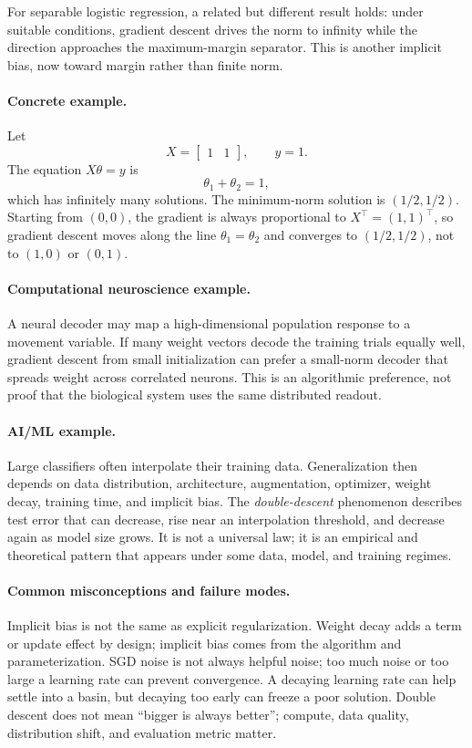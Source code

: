 For separable logistic regression, a related but different result holds: under suitable conditions, gradient descent drives the norm to infinity while the direction approaches the maximum-margin separator. This is another implicit bias, now toward margin rather than finite norm.

\paragraph{Concrete example.}
Let
\[
X=\begin{bmatrix}1&1\end{bmatrix},\qquad y=1.
\]
The equation \(X\theta=y\) is
\[
\theta_1+\theta_2=1,
\]
which has infinitely many solutions. The minimum-norm solution is \((1/2,1/2)\). Starting from \((0,0)\), the gradient is always proportional to \(X^\top=(1,1)^\top\), so gradient descent moves along the line \(\theta_1=\theta_2\) and converges to \((1/2,1/2)\), not to \((1,0)\) or \((0,1)\).

\paragraph{Computational neuroscience example.}
A neural decoder may map a high-dimensional population response to a movement variable. If many weight vectors decode the training trials equally well, gradient descent from small initialization can prefer a small-norm decoder that spreads weight across correlated neurons. This is an algorithmic preference, not proof that the biological system uses the same distributed readout.

\paragraph{AI/ML example.}
Large classifiers often interpolate their training data. Generalization then depends on data distribution, architecture, augmentation, optimizer, weight decay, training time, and implicit bias. The \emph{double-descent} phenomenon describes test error that can decrease, rise near an interpolation threshold, and decrease again as model size grows. It is not a universal law; it is an empirical and theoretical pattern that appears under some data, model, and training regimes.

\paragraph{Common misconceptions and failure modes.}
Implicit bias is not the same as explicit regularization. Weight decay adds a term or update effect by design; implicit bias comes from the algorithm and parameterization. SGD noise is not always helpful noise; too much noise or too large a learning rate can prevent convergence. A decaying learning rate can help settle into a basin, but decaying too early can freeze a poor solution. Double descent does not mean ``bigger is always better''; compute, data quality, distribution shift, and evaluation metric matter.

